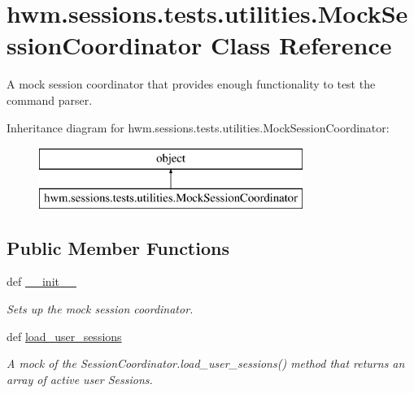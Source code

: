 \hypertarget{classhwm_1_1sessions_1_1tests_1_1utilities_1_1_mock_session_coordinator}{\section{hwm.\-sessions.\-tests.\-utilities.\-Mock\-Session\-Coordinator Class Reference}
\label{classhwm_1_1sessions_1_1tests_1_1utilities_1_1_mock_session_coordinator}
}


A mock session coordinator that provides enough functionality to test the command parser.  


Inheritance diagram for hwm.\-sessions.\-tests.\-utilities.\-Mock\-Session\-Coordinator\-:\begin{figure}[H]
\begin{center}
\leavevmode
\includegraphics[height=2.000000cm]{classhwm_1_1sessions_1_1tests_1_1utilities_1_1_mock_session_coordinator}
\end{center}
\end{figure}
\subsection*{Public Member Functions}
\begin{DoxyCompactItemize}
\item 
\hypertarget{classhwm_1_1sessions_1_1tests_1_1utilities_1_1_mock_session_coordinator_affeba35f03f6fcb73bf9684fc45c5495}{def \hyperlink{classhwm_1_1sessions_1_1tests_1_1utilities_1_1_mock_session_coordinator_affeba35f03f6fcb73bf9684fc45c5495}{\-\_\-\-\_\-init\-\_\-\-\_\-}}\label{classhwm_1_1sessions_1_1tests_1_1utilities_1_1_mock_session_coordinator_affeba35f03f6fcb73bf9684fc45c5495}

\begin{DoxyCompactList}\small\item\em Sets up the mock session coordinator. \end{DoxyCompactList}\item 
def \hyperlink{classhwm_1_1sessions_1_1tests_1_1utilities_1_1_mock_session_coordinator_ae4227556ee989777f925f0e194df86ab}{load\-\_\-user\-\_\-sessions}
\begin{DoxyCompactList}\small\item\em A mock of the Session\-Coordinator.\-load\-\_\-user\-\_\-sessions() method that returns an array of active user Sessions. \end{DoxyCompactList}\end{DoxyCompactItemize}



